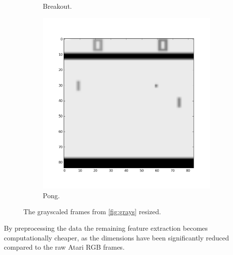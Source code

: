 \documentclass[11pt]{article}
\begin{document}
\begin{figure}[H]
\begin{subfigure}{.3\textwidth}
        \caption{Breakout.}
        \label{fig:scanlike}
    \end{subfigure}
    \begin{subfigure}{.3\textwidth}
        \centering
        \includegraphics[scale=0.23]{include/pong_1_gray_resized.png}
        \caption{Pong.}
        \label{fig:scan}
    \end{subfigure}
    \caption{The grayscaled frames from \ref{fig:grays} resized.}
     \label{fig:rez}
\end{figure}

By preprocessing the data the remaining feature extraction becomes computationally 
cheaper, as the dimensions have been significantly reduced compared to the raw Atari RGB frames.
\end{document}
